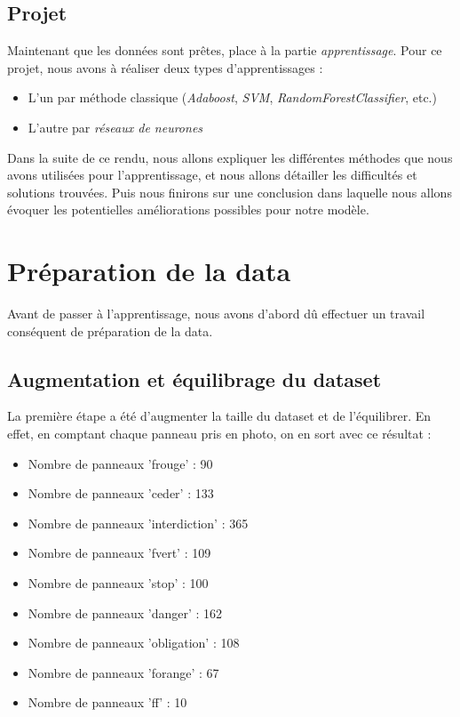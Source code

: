\documentclass[twocolumn,10pt]{article}
\begin{document}
    \subsection{Projet}

    Maintenant que les données sont prêtes, place à la partie \textit{apprentissage}. Pour ce projet, nous avons à réaliser deux types d’apprentissages :
    \begin{itemize}
        \item L’un par méthode classique (\textit{Adaboost}, \textit{SVM}, \textit{RandomForestClassifier}, etc.)
        \item L’autre par \textit{réseaux de neurones}
    \end{itemize}

    Dans la suite de ce rendu, nous allons expliquer les différentes méthodes que nous avons utilisées pour l’apprentissage, et nous allons détailler les difficultés et solutions trouvées. Puis nous finirons sur une conclusion dans laquelle nous allons évoquer les potentielles améliorations possibles pour notre modèle.


    \section{Préparation de la data}
    Avant de passer à l’apprentissage, nous avons d’abord dû effectuer un travail conséquent de préparation de la data.

    \subsection{Augmentation et équilibrage du dataset}
    La première étape a été d’augmenter la taille du dataset et de l’équilibrer. En effet, en comptant chaque panneau pris en photo, on en sort avec ce résultat :
    \begin{itemize}
        \item Nombre de panneaux 'frouge' : 90
        \item Nombre de panneaux 'ceder' : 133
        \item Nombre de panneaux 'interdiction' : 365
        \item Nombre de panneaux 'fvert' : 109
        \item Nombre de panneaux 'stop' : 100
        \item Nombre de panneaux 'danger' : 162
        \item Nombre de panneaux 'obligation' : 108
        \item Nombre de panneaux 'forange' : 67
        \item Nombre de panneaux 'ff' : 10
    \end{itemize}
\end{document}
